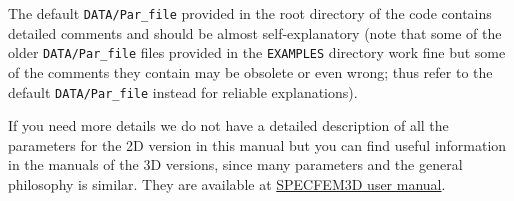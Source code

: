 The default \texttt{DATA/Par\_file} provided in the root directory of the code contains detailed comments and should be almost self-explanatory
(note that some of the older \texttt{DATA/Par\_file} files provided in the \texttt{EXAMPLES} directory work fine but some of the comments
they contain may be obsolete or even wrong; thus refer to the default \texttt{DATA/Par\_file} instead for reliable explanations).\newline

If you need more details we do not have a detailed description of all the parameters for the 2D version in this manual
but you can find useful information in the manuals of the 3D versions, since many parameters and the general philosophy is similar. They are available at
\href{https://github.com/SPECFEM/specfem3d/tree/master/doc/USER_MANUAL}{SPECFEM3D user manual}.\newline

